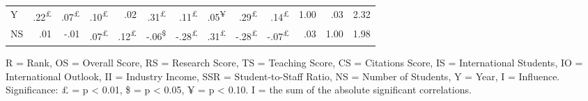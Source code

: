 \documentclass{singlecol-new}
\theoremstyle{TH}{
\newtheorem{lemma}{Lemma}
\newtheorem{theorem}[lemma]{Theorem}
\newtheorem{corrolary}[lemma]{Corrolary}
\newtheorem{conjecture}[lemma]{Conjecture}
\newtheorem{proposition}[lemma]{Proposition}
\newtheorem{claim}[lemma]{Claim}
\newtheorem{stheorem}[lemma]{Wrong Theorem}
\newtheorem{algorithm}{Algorithm}
}
\theoremstyle{THrm}{
\newtheorem{definition}{Definition}[section]
\newtheorem{question}{Question}[section]
\newtheorem{remark}{Remark}
\newtheorem{scheme}{Scheme}
}
\theoremstyle{THhit}{
\newtheorem{case}{Case}[section]
}
\begin{document}
\begin{table*}[h!]
\begin{tabular}{lrrrrrrrrrrrr}
		Y & \cellcolor{gray!11}.22\textsuperscript{£} & \cellcolor{gray!3}.07\textsuperscript{£} & \cellcolor{gray!5}.10\textsuperscript{£} & \cellcolor{gray!1}.02 & \cellcolor{gray!15}.31\textsuperscript{£} & \cellcolor{gray!5}.11\textsuperscript{£} & \cellcolor{gray!2}.05\textsuperscript{¥} & \cellcolor{gray!14}.29\textsuperscript{£} & \cellcolor{gray!7}.14\textsuperscript{£} & \cellcolor{gray!50}1.00 & \cellcolor{gray!1}.03 & 2.32 \\ 
		
		NS & \cellcolor{gray!0}.01 & \cellcolor{gray!0}-.01 & \cellcolor{gray!3}.07\textsuperscript{£} & \cellcolor{gray!6}.12\textsuperscript{£} & \cellcolor{gray!3}-.06\textsuperscript{\$} & \cellcolor{gray!14}-.28\textsuperscript{£} & \cellcolor{gray!15}.31\textsuperscript{£} & \cellcolor{gray!14}-.28\textsuperscript{£} & \cellcolor{gray!3}-.07\textsuperscript{£} & \cellcolor{gray!1}.03 & \cellcolor{gray!50}1.00 & 1.98 \\
		
	\end{tabular}
	
	\vspace{1mm}
	
	\scriptsize \raggedleft
	R = Rank, OS = Overall Score, RS = Research Score, TS = Teaching Score, CS = Citations Score, IS = International Students, IO = International Outlook, II = Industry Income, SSR = Student-to-Staff Ratio, NS = Number of Students, Y = Year, I = Influence. Significance: £ = p < 0.01, \$ = p < 0.05, ¥  = p < 0.10.  I = the sum of the absolute significant correlations.
	
\end{table*}
\end{document}
